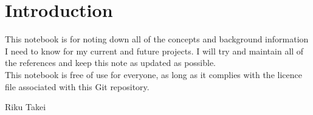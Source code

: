 
\chapter{Introduction}
\label{cha:introduction}

This notebook is for noting down all of the concepts and background information I need to know for my current and future projects.
I will try and maintain all of the references and keep this note as updated as possible.
\\

\noindent
This notebook is free of use for everyone, as long as it complies with the licence file associated with this Git repository.

\vfill

Riku Takei
